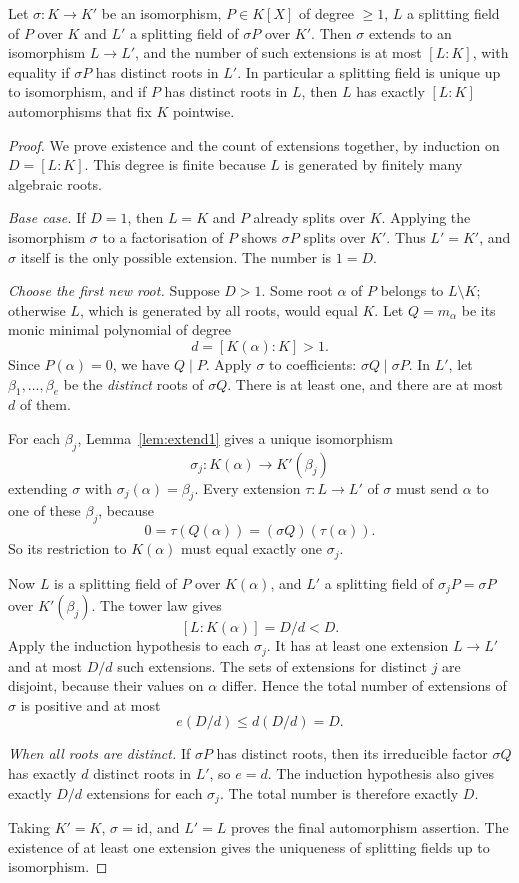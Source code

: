 \begin{theorem}\label{thm:splitunique}
Let $\sigma:K\to K'$ be an isomorphism, $P\in K[X]$ of degree $\ge1$, $L$ a splitting field of $P$ over $K$ and $L'$ a splitting field of $\sigma P$ over $K'$. Then $\sigma$ extends to an isomorphism $L\to L'$, and the number of such extensions is at most $[L:K]$, with equality if $\sigma P$ has distinct roots in $L'$.
In particular a splitting field is unique up to isomorphism, and if $P$ has distinct roots in $L$, then $L$ has exactly $[L:K]$ automorphisms that fix $K$ pointwise.
\end{theorem}
\begin{proof}
We prove existence and the count of extensions
together, by induction on $D=[L:K]$.
This degree is finite because $L$ is
generated by finitely many algebraic roots.

\emph{Base case.}
If $D=1$, then $L=K$ and $P$ already
splits over $K$. Applying the isomorphism
$\sigma$ to a factorisation of $P$
shows $\sigma P$ splits over $K'$.
Thus $L'=K'$, and $\sigma$ itself
is the only possible extension.
The number is $1=D$.

\emph{Choose the first new root.}
Suppose $D>1$. Some root $\alpha$
of $P$ belongs to $L\setminus K$;
otherwise $L$, which is generated by
all roots, would equal $K$.
Let $Q=m_\alpha$ be its monic minimal
polynomial of degree
\[
d=[K(\alpha):K]>1.
\]
Since $P(\alpha)=0$, we have $Q\mid P$.
Apply $\sigma$ to coefficients:
$\sigma Q\mid\sigma P$.
In $L'$, let $\beta_1,\ldots,\beta_e$
be the \emph{distinct} roots of
$\sigma Q$. There is at least one,
and there are at most $d$ of them.

For each $\beta_j$,
Lemma~\ref{lem:extend1} gives a unique
isomorphism
\[
\sigma_j:K(\alpha)\to K'(\beta_j)
\]
extending $\sigma$ with
$\sigma_j(\alpha)=\beta_j$.
Every extension $\tau:L\to L'$
of $\sigma$ must send $\alpha$
to one of these $\beta_j$, because
\[
0=\tau(Q(\alpha))
=(\sigma Q)(\tau(\alpha)).
\]
So its restriction to $K(\alpha)$
must equal exactly one $\sigma_j$.

Now $L$ is a splitting field of $P$
over $K(\alpha)$, and $L'$ a splitting
field of $\sigma_jP=\sigma P$
over $K'(\beta_j)$. The tower law gives
\[
[L:K(\alpha)]=D/d<D.
\]
Apply the induction hypothesis to
each $\sigma_j$. It has at least one
extension $L\to L'$ and at most
$D/d$ such extensions. The sets
of extensions for distinct $j$
are disjoint, because their values
on $\alpha$ differ. Hence the total
number of extensions of $\sigma$
is positive and at most
\[
e(D/d)\le d(D/d)=D.
\]

\emph{When all roots are distinct.}
If $\sigma P$ has distinct roots,
then its irreducible factor $\sigma Q$
has exactly $d$ distinct roots in $L'$,
so $e=d$. The induction hypothesis
also gives exactly $D/d$ extensions
for each $\sigma_j$. The total
number is therefore exactly $D$.

Taking $K'=K$, $\sigma=\mathrm{id}$,
and $L'=L$ proves the final
automorphism assertion.
The existence of at least one
extension gives the uniqueness of
splitting fields up to isomorphism.
\end{proof}

